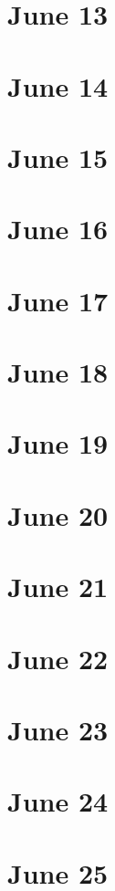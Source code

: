 \section{June 13}

\section{June 14}

\section{June 15}

\section{June 16}

\section{June 17}

\section{June 18}

\section{June 19}

\section{June 20}

\section{June 21}

\section{June 22}

\section{June 23}

\section{June 24}

\section{June 25}

